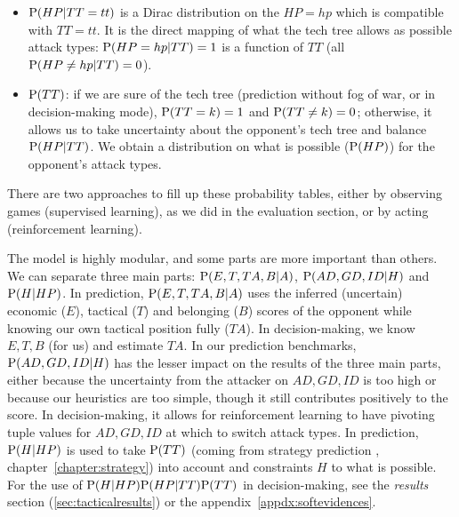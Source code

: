 \begin{itemize}
\item $\mathrm{P}(HP|TT=tt)$ is a Dirac distribution on the $HP=hp$ which is compatible with $TT=tt$. It is the direct mapping of what the tech tree allows as possible attack types: $\mathrm{P}(HP=hp|TT)=1$ is a function of $TT$ (all $\mathrm{P}(HP\neq hp|TT)=0$).

\item $\mathrm{P}(TT)$: if we are sure of the tech tree (prediction without fog of war, or in decision-making mode), $\mathrm{P}(TT=k)=1$ and $\mathrm{P}(TT\neq k)=0$; otherwise, it allows us to take uncertainty about the opponent's tech tree and balance $\mathrm{P}(HP|TT)$. We obtain a distribution on what is possible ($\mathrm{P}(HP)$) for the opponent's attack types.
\end{itemize}

There are two approaches to fill up these probability tables, either by observing games (supervised learning), as we did in the evaluation section, or by acting (reinforcement learning). %

The model is highly modular, and some parts are more important than others. We can separate three main parts: $\mathrm{P}(E,T,TA,B|A)$, $\mathrm{P}(AD,GD,ID|H)$ and $\mathrm{P}(H|HP)$. In prediction, $\mathrm{P}(E,T,TA,B|A)$ uses the inferred (uncertain) economic ($E$), tactical ($T$) and belonging ($B$) scores of the opponent while knowing our own tactical position fully ($TA$). In decision-making, we know $E,T,B$ (for us) and estimate $TA$. In our prediction benchmarks, $\mathrm{P}(AD,GD,ID|H)$ has the lesser impact on the results of the three main parts, either because the uncertainty from the attacker on $AD,GD,ID$ is too high or because our heuristics are too simple, though it still contributes positively to the score. In decision-making, it allows for reinforcement learning to have pivoting tuple values for $AD,GD,ID$ at which to switch attack types. In prediction, $\mathrm{P}(H|HP)$ is used to take $\mathrm{P}(TT)$ (coming from strategy prediction \citep{SYNNAEVE:StratPred}, chapter~\ref{chapter:strategy}) into account and constraints $H$ to what is possible. For the use of $\mathrm{P}(H|HP)\mathrm{P}(HP|TT)\mathrm{P}(TT)$ in decision-making, see the \textit{results} section (\ref{sec:tacticalresults}) or the appendix~\ref{appdx:softevidences}.

